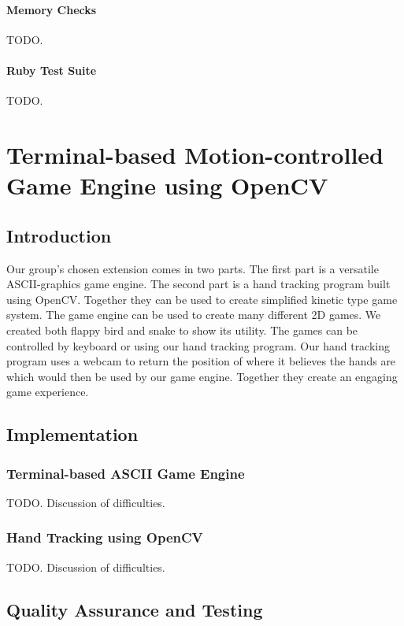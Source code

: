 \documentclass[10pt]{article}
\begin{document}
\paragraph{Memory Checks}
TODO.

\paragraph{Ruby Test Suite}
TODO.

\section{Terminal-based Motion-controlled Game Engine using OpenCV}

\subsection{Introduction}

Our group’s chosen extension comes in two parts. The first part is a versatile ASCII-graphics game engine. The second part is a hand tracking program built using OpenCV. Together they can be used to create simplified kinetic type game system. The game engine can be used to create many different 2D games. We created both flappy bird and snake to show its utility. The games can be controlled by keyboard or using our hand tracking program. Our hand tracking program uses a webcam to return the position of where it believes the hands are which would then be used by our game engine. Together they create an engaging game experience.

\subsection{Implementation}

\subsubsection{Terminal-based ASCII Game Engine}

TODO. Discussion of difficulties.

\subsubsection{Hand Tracking using OpenCV}

TODO. Discussion of difficulties.

\subsection{Quality Assurance and Testing}
\end{document}

